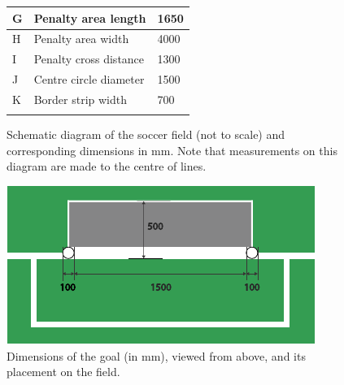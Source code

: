 \begin{figure}[b!]
\begin{tabular}{|l|l|l|}
		\hline \hline
		G & Penalty area length & 1650 \\
		\hline
		H & Penalty area width & 4000 \\
		\hline
		I & Penalty cross distance & 1300 \\
		\hline
		J & Centre circle diameter & 1500 \\
		\hline
		K & Border strip width & 700 \\
		\hline
		&  &  \\
	\end{tabular}
	\caption{Schematic diagram of the   soccer field (not to scale) and corresponding dimensions in mm. Note that measurements on this diagram are made to the centre of lines.} \label{fig:field_dim}
\end{figure}


\begin{figure}[t!]
	\begin{center}
		\leavevmode
		\includegraphics[width=1\columnwidth]{figs/goalDimensions2015.pdf}
		\caption{Dimensions of the goal (in mm), viewed from above, and its placement on the field.}
		\label{fig:goal_dimensions}
	\end{center}
\end{figure}

